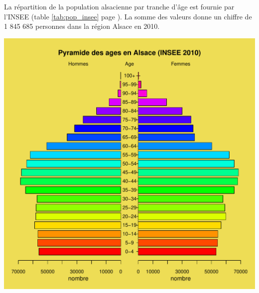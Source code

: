 \documentclass[12pt,english,french,twoside]{book}\usepackage[]{graphicx}\usepackage[]{color}
\makeatletter
\def\maxwidth{ %
  \ifdim\Gin@nat@width>\linewidth
    \linewidth
  \else
    \Gin@nat@width
  \fi
}
\newenvironment{knitrout}{}{} %
\makeatother
\begin{document}
La répartition de la population alsacienne par tranche d'âge est fournie par l'INSEE (table \ref{tab:pop_insee} page \pageref{tab:pop_insee}). La somme des valeurs donne un chiffre de 1 845 685 personnes dans la région Alsace en 2010.

\begin{center}
\begin{knitrout}
\color{fgcolor}
\includegraphics[width=\maxwidth]{figure/pyramide_graphe-1} 

\end{knitrout}
\label{fig:pyr_age_insee}
\end{center}

\end{document}
